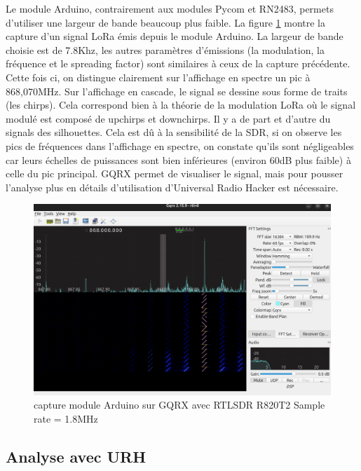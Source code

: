 Le module Arduino, contrairement aux modules Pycom et RN2483, permets d'utiliser une largeur de bande beaucoup plus faible. La figure \ref{term302} montre la capture d'un signal \ac{LoRa} émis depuis le module Arduino. La largeur de bande choisie est de 7.8Khz, les autres paramètres d'émissions (la modulation, la fréquence et le spreading factor) sont similaires à ceux de la capture précédente. Cette fois ci, on distingue clairement sur l'affichage en spectre un pic à 868,070MHz. Sur l'affichage en cascade, le signal se dessine sous forme de traits (les chirps). Cela correspond bien à la théorie de la modulation \ac{LoRa} où le signal modulé est composé de upchirps et downchirps. Il y a de part et d'autre du signals des silhouettes. Cela est dû à la sensibilité de la \ac{SDR}, si on observe les pics de fréquences dans l'affichage en spectre, on constate qu'ils sont négligeables car leurs échelles de puissances sont bien inférieures (environ 60dB plus faible) à celle du pic principal. GQRX permet de visualiser le signal, mais pour pousser l'analyse plus en détails d'utilisation d'Universal Radio Hacker est nécessaire.

\begin{figure}[h]
\centering

\includegraphics[scale=0.17]{images/gqrx5.png}
\caption{capture module Arduino sur GQRX avec RTLSDR R820T2 Sample rate = 1.8MHz}\label{term302}
\end{figure}


\subsection{Analyse avec URH}\label{urh}

